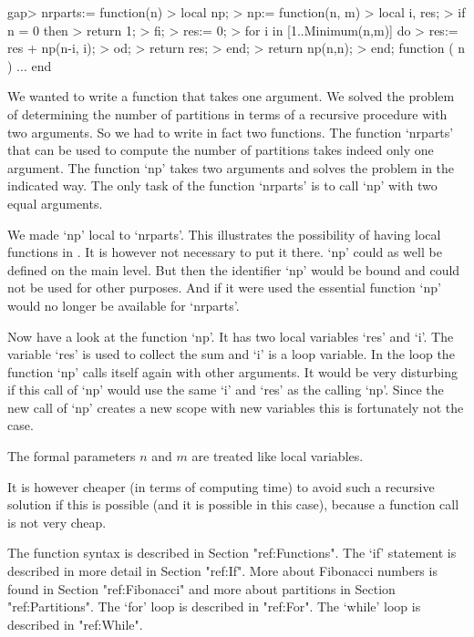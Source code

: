 \beginexample
    gap> nrparts:= function(n)
    >    local np;
    >    np:= function(n, m)
    >       local i, res;
    >       if n = 0 then
    >          return 1;
    >       fi;
    >       res:= 0;
    >       for i in [1..Minimum(n,m)] do
    >          res:= res + np(n-i, i);
    >       od;
    >       return res;
    >    end;
    >    return np(n,n);
    > end;
    function ( n ) ... end
\endexample

We wanted to  write a function that  takes one argument.   We solved  the
problem of determining the number  of partitions in  terms of a recursive
procedure with two arguments.  So we had to write  in fact two functions.
The  function  `nrparts' that  can  be  used  to  compute the  number  of
partitions takes indeed only one  argument.  The  function `np' takes two
arguments and solves the problem in the indicated way.  The  only task of
the function `nrparts' is to call `np' with two equal arguments.

We made `np'  local to `nrparts'.   This  illustrates the  possibility of
having local functions in {\GAP}.   It is however not necessary to put it
there.  `np' could as  well be defined on the main level.   But  then the
identifier `np'  would be bound and could not be used for other purposes.
And  if  it were used  the essential  function  `np' would no  longer  be
available for `nrparts'.

Now have  a look at the function  `np'.  It has two local variables `res'
and `i'.  The variable `res' is used to collect the sum and `i' is a loop
variable.  In the loop  the  function `np' calls itself again with  other
arguments.  It would be  very disturbing if this call of  `np' would  use
the same `i' and `res'  as  the calling `np'.  Since the new call of `np'
creates a new scope with new variables this is fortunately not the case.

The formal parameters $n$ and $m$ are treated like local variables.

It  is however  cheaper  (in  terms of  computing time)  to avoid such  a
recursive solution if this is possible (and it is possible in this case),
because a function call is not very cheap.


The function  syntax is described  in Section "ref:Functions".   The `if'
statement is described  in more detail in  Section "ref:If".  More  about
Fibonacci  numbers is found  in  Section "ref:Fibonacci"  and more  about
partitions in Section "ref:Partitions".
The `for' loop is described in "ref:For".
The `while' loop is described in "ref:While".







